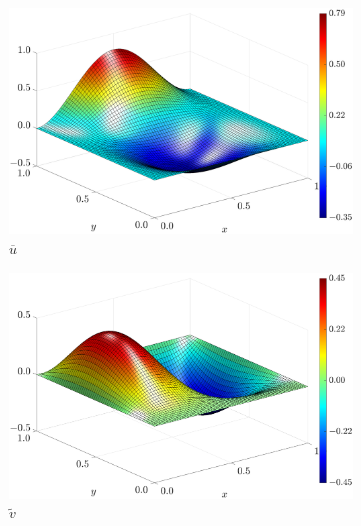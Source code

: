 \documentclass[preprint, 12pt]{elsarticle}
\begin{document}
\begin{figure}[H]
    \centering
    \begin{subfigure}[b]{.46\textwidth}
        \includegraphics[width=\textwidth]{Exact_Surf_NormErr_2nd_Betann_0.1_Re_1_Wi_1_epsilon_0_xi_0_alphaG_0_Dt_1e-06_at_0.05_tipsim_1_MMS_12_U.eps}
        \caption{$\overline{u}$\label{fig:solexauCase1}}
    \end{subfigure}
    \vspace{0.2cm}
    \begin{subfigure}[b]{.46\textwidth}
        \includegraphics[width=\textwidth]{Exact_Surf_NormErr_2nd_Betann_0.1_Re_1_Wi_1_epsilon_0_xi_0_alphaG_0_Dt_1e-06_at_0.05_tipsim_1_MMS_12_V.eps}
        \caption{$\widetilde{v}$\label{fig:solexavCase1}}
    \end{subfigure}
    \begin{subfigure}[b]{.46\textwidth}

\end{subfigure}
\end{figure}
\end{document}
